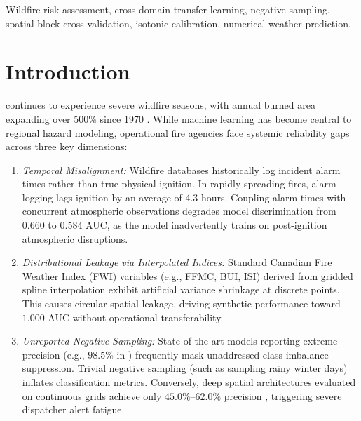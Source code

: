 \documentclass[journal]{IEEEtran}
\begin{document}
\begin{IEEEkeywords}
{\color{Maroon}Wildfire risk assessment, cross-domain transfer learning, negative sampling, spatial block cross-validation, isotonic calibration, numerical weather prediction.}
\end{IEEEkeywords}

\section{Introduction}
 continues to experience severe wildfire seasons, with annual burned area expanding over 500\% since 1970 \cite{williams2019}. While machine learning has become central to regional hazard modeling, operational fire agencies face systemic reliability gaps across three key dimensions:

\begin{enumerate}
    \item \emph{\color{Maroon}Temporal Misalignment:} Wildfire databases historically log incident alarm times rather than true physical ignition. In rapidly spreading fires, alarm logging lags ignition by an average of 4.3 hours. Coupling alarm times with concurrent atmospheric observations degrades model discrimination from $0.660$ to $0.584$ AUC, as the model inadvertently trains on post-ignition atmospheric disruptions.
    \item \emph{\color{Maroon}Distributional Leakage via Interpolated Indices:} Standard Canadian Fire Weather Index (FWI) variables (e.g., FFMC, BUI, ISI) derived from gridded spline interpolation exhibit artificial variance shrinkage at discrete points. This causes circular spatial leakage, driving synthetic performance toward $1.000$ AUC without operational transferability.
    \item \emph{\color{Maroon}Unreported Negative Sampling:} State-of-the-art models reporting extreme precision (e.g., $98.5\%$ in \cite{liao2024}) frequently mask unaddressed class-imbalance suppression. Trivial negative sampling (such as sampling rainy winter days) inflates classification metrics. Conversely, deep spatial architectures evaluated on continuous grids achieve only $45.0\%$--$62.0\%$ precision \cite{stanford2023}, triggering severe dispatcher alert fatigue.
\end{enumerate}
\end{document}
